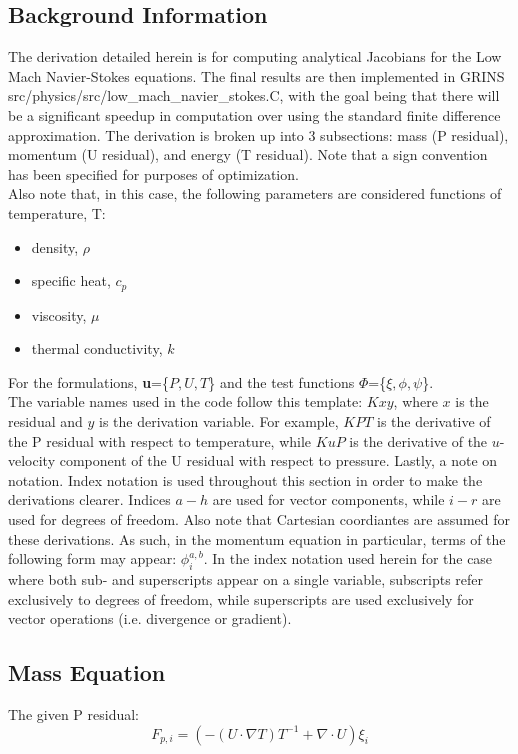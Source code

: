 \subsection{Background Information}
The derivation detailed herein is for computing analytical Jacobians for the Low Mach Navier-Stokes equations. The final results are then implemented in GRINS src/physics/src/low\_mach\_navier\_stokes.C, with the goal being that there
will be a significant speedup in computation over using the standard finite difference approximation. The derivation is broken up into 3 subsections: mass (P residual), momentum (U residual), and energy (T residual).
Note that a sign convention has been specified for purposes of optimization.\\
Also note that, in this case, the following parameters are considered functions of temperature, T:
\begin{itemize}
    \item density, $\rho$
    \item specific heat, $c_p$
    \item viscosity, $\mu$
    \item thermal conductivity, $k$
\end{itemize}
For the formulations, \textbf{u}=\{$P,U,T$\} and the test functions \textbf{$\Phi$}=\{$\xi,\phi,\psi$\}.\\
The variable names used in the code follow this template: $Kxy$, where $x$ is the residual and $y$ is the derivation variable.  For example, $KPT$ is the derivative of the P residual with respect to temperature,
while $KuP$ is the derivative of the $u$-velocity component of the U residual with respect to pressure. \newline
Lastly, a note on notation. Index notation is used throughout this section in order to make the derivations clearer. Indices $a-h$ are used for vector components, while $i-r$ are used for degrees of freedom.
Also note that Cartesian coordiantes are assumed for these derivations. As such, in the momentum equation in particular, terms of the following form may appear: $\phi_i^{a,b}$. In the index notation used herein for the case
where both sub- and superscripts appear on a single variable, 
subscripts refer exclusively to degrees of freedom, while superscripts are used exclusively for vector operations (i.e. divergence or gradient).

\newpage
\subsection{Mass Equation}
The given P residual:
\begin{equation}
    F_{p,i} = (-(U \cdot \nabla T) T^{-1} + \nabla \cdot U)\xi_i
\end{equation}

